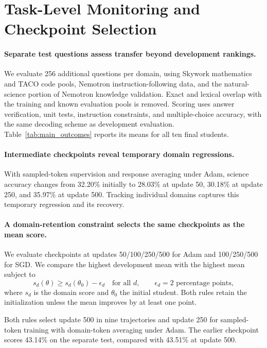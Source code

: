 \section{Task-Level Monitoring and Checkpoint Selection}
\label{sec:recipe}

\paragraph{Separate test questions assess transfer beyond development rankings.}
We evaluate 256 additional questions per domain, using Skywork mathematics and TACO code pools, Nemotron instruction-following data, and the natural-science portion of Nemotron knowledge validation. Exact and lexical overlap with the training and known evaluation pools is removed. Scoring uses answer verification, unit tests, instruction constraints, and multiple-choice accuracy, with the same decoding scheme as development evaluation. Table~\ref{tab:main_outcomes} reports its means for all ten final students.

\paragraph{Intermediate checkpoints reveal temporary domain regressions.}
With sampled-token supervision and response averaging under Adam, science accuracy changes from 32.20\% initially to 28.03\% at update 50, 30.18\% at update 250, and 35.97\% at update 500. Tracking individual domains captures this temporary regression and its recovery.

\paragraph{A domain-retention constraint selects the same checkpoints as the mean score.}
We evaluate checkpoints at updates 50/100/250/500 for Adam and 100/250/500 for SGD. We compare the highest development mean with the highest mean subject to
\begin{equation}
s_d(\theta)\geq s_d(\theta_0)-\epsilon_d\quad\text{for all }d,
\qquad \epsilon_d=2\text{ percentage points},
\label{eq:retention}
\end{equation}
where $s_d$ is the domain score and $\theta_0$ the initial student. Both rules retain the initialization unless the mean improves by at least one point.

Both rules select update 500 in nine trajectories and update 250 for sampled-token training with domain-token averaging under Adam. The earlier checkpoint scores 43.14\% on the separate test, compared with 43.51\% at update 500.

